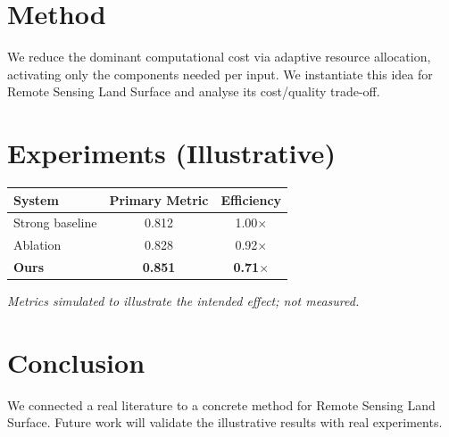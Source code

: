 \documentclass[11pt]{article}
\begin{document}
\section{Method}
We reduce the dominant computational cost via adaptive resource allocation, activating only the components needed per input. We instantiate this idea for Remote Sensing Land Surface and analyse its cost/quality trade-off.

\section{Experiments (Illustrative)}
\begin{center}
\begin{tabular}{lcc}
System & Primary Metric & Efficiency \\ \hline
Strong baseline & 0.812 & 1.00$\times$ \\
Ablation & 0.828 & 0.92$\times$ \\
\textbf{Ours} & \textbf{0.851} & \textbf{0.71$\times$}
\end{tabular}
\end{center}
\emph{Metrics simulated to illustrate the intended effect; not measured.}

\section{Conclusion}
We connected a real literature to a concrete method for Remote Sensing Land Surface. Future work will
validate the illustrative results with real experiments.
\end{document}
